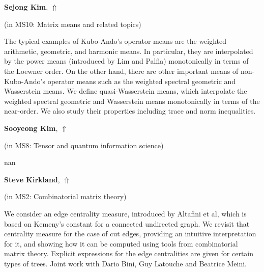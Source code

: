 \documentclass[ILAS2025-program.tex]{subfiles}
\begin{document}
     \hypertarget{down0023}{}\begin{ilasabstract}
    
    \textbf{Sejong Kim},  \hfill \hyperlink{up0023}{$\Uparrow$}
    
    (in {\color{mstitle}MS10: Matrix means and related topics})
        
        \mtskip
    The typical examples of Kubo-Ando's operator means are the weighted arithmetic, geometric, and harmonic means. In particular, they are interpolated by the power means (introduced by Lim and Palfia) monotonically in terms of the Loewner order. On the other hand, there are other important means of non-Kubo-Ando's operator means such as the weighted spectral geometric and Wasserstein means. We define quasi-Wasserstein means, which interpolate the weighted spectral geometric and Wasserstein means monotonically in terms of the near-order. We also study their properties including trace and norm inequalities.
\end{ilasabstract}
     \hypertarget{down0283}{}\begin{ilasabstract}
    
    \textbf{Sooyeong Kim},  \hfill \hyperlink{up0283}{$\Uparrow$}
    
    (in {\color{mstitle}MS8: Tensor and quantum information science})
        
        \mtskip
    nan\end{ilasabstract}
     \hypertarget{down0295}{}\begin{ilasabstract}
    
    \textbf{Steve Kirkland},  \hfill \hyperlink{up0295}{$\Uparrow$}
    
    (in {\color{mstitle}MS2: Combinatorial matrix theory})
        
        \mtskip
    We consider an edge centrality measure, introduced by Altafini et al, which is based on Kemeny's constant for a connected undirected graph. We revisit that centrality measure for the case of cut edges, providing an intuitive  interpretation for it, and showing how it can be computed using tools from combinatorial matrix theory. Explicit expressions for the edge centralities are given for certain types of trees. Joint work with Dario Bini, Guy Latouche and Beatrice Meini.  
\end{ilasabstract}
\end{document}
